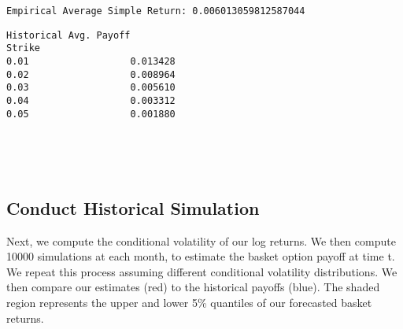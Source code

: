\documentclass[11pt]{article}
\begin{document}
    \begin{Verbatim}[commandchars=\\\{\}]
Empirical Average Simple Return: 0.006013059812587044
    \end{Verbatim}

    
    \begin{Verbatim}[commandchars=\\\{\}]
        Historical Avg. Payoff
Strike                        
0.01                  0.013428
0.02                  0.008964
0.03                  0.005610
0.04                  0.003312
0.05                  0.001880
    \end{Verbatim}

    
    \begin{center}
    \end{center}
    { \hspace*{\fill} \\}
    
    \begin{center}
    \end{center}
    { \hspace*{\fill} \\}
    
    \subsection{Conduct Historical
Simulation}\label{conduct-historical-simulation}

Next, we compute the conditional volatility of our log returns. We then
compute 10000 simulations at each month, to estimate the basket option
payoff at time t. We repeat this process assuming different conditional
volatility distributions. We then compare our estimates (red) to the
historical payoffs (blue). The shaded region represents the upper and
lower 5\% quantiles of our forecasted basket returns.
\end{document}
